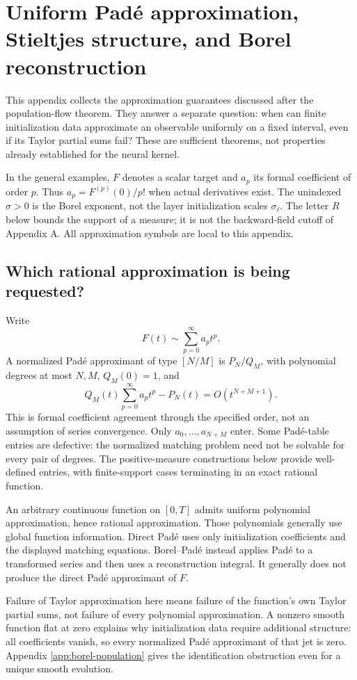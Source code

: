 \section{Uniform Pad\'e approximation, Stieltjes structure, and Borel reconstruction}
\label{app:pade-borel}

This appendix collects the approximation guarantees discussed after the
population-flow theorem. They answer a separate question: when can finite
initialization data approximate an observable uniformly on a fixed interval,
even if its Taylor partial sums fail? These are sufficient theorems, not
properties already established for the neural kernel.

In the general examples, $F$ denotes a scalar target and $a_p$ its formal
coefficient of order $p$. Thus $a_p=F^{(p)}(0)/p!$ when actual derivatives
exist. The unindexed $\sigma>0$ is the Borel exponent, not the layer
initialization scales $\sigma_\ell$. The letter $R$ below bounds the
support of a measure; it is not the backward-field cutoff of Appendix A.
All approximation symbols are local to this appendix.

\subsection{Which rational approximation is being requested?}

Write
\[
 F(t)\sim\sum_{p=0}^{\infty}a_p t^p.
\]
A normalized Pad\'e approximant of type $[N/M]$ is $P_N/Q_M$, with
polynomial degrees at most $N,M$, $Q_M(0)=1$, and
\[
 Q_M(t)\sum_{p=0}^{\infty}a_p t^p-P_N(t)=O(t^{N+M+1}).
\]
This is formal coefficient agreement through the specified order, not an
assumption of series convergence. Only $a_0,\ldots,a_{N+M}$ enter.
Some Pad\'e-table entries are defective: the normalized matching problem
need not be solvable for every pair of degrees. The positive-measure
constructions below provide well-defined entries, with finite-support
cases terminating in an exact rational function.

An arbitrary continuous function on $[0,T]$ admits uniform polynomial
approximation, hence rational approximation. Those polynomials generally
use global function information. Direct Pad\'e uses only initialization
coefficients and the displayed matching equations. Borel--Pad\'e instead
applies Pad\'e to a transformed series and then uses a reconstruction
integral. It generally does not produce the direct Pad\'e approximant of $F$.

Failure of Taylor approximation here means failure of the function's own
Taylor partial sums, not failure of every polynomial approximation.
A nonzero smooth function flat at zero explains why initialization data
require additional structure: all coefficients vanish, so every normalized
Pad\'e approximant of that jet is zero. Appendix
\ref{app:borel-population} gives the identification obstruction even for a
unique smooth evolution.

